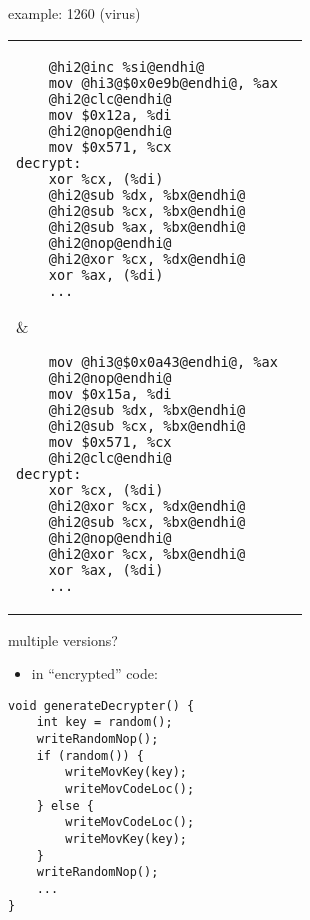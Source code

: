 \begin{frame}[fragile,label=v1260]{example: 1260 (virus)}
\begin{tabular}{ll}
\begin{lstlisting}
    @hi2@inc %si@endhi@
    mov @hi3@$0x0e9b@endhi@, %ax
    @hi2@clc@endhi@
    mov $0x12a, %di
    @hi2@nop@endhi@
    mov $0x571, %cx
decrypt:
    xor %cx, (%di)
    @hi2@sub %dx, %bx@endhi@
    @hi2@sub %cx, %bx@endhi@
    @hi2@sub %ax, %bx@endhi@
    @hi2@nop@endhi@
    @hi2@xor %cx, %dx@endhi@
    xor %ax, (%di)
    ...
\end{lstlisting}
&
\begin{lstlisting}
    mov @hi3@$0x0a43@endhi@, %ax
    @hi2@nop@endhi@
    mov $0x15a, %di
    @hi2@sub %dx, %bx@endhi@
    @hi2@sub %cx, %bx@endhi@
    mov $0x571, %cx
    @hi2@clc@endhi@
decrypt:
    xor %cx, (%di)
    @hi2@xor %cx, %dx@endhi@
    @hi2@sub %cx, %bx@endhi@
    @hi2@nop@endhi@
    @hi2@xor %cx, %bx@endhi@
    xor %ax, (%di)
    ...
\end{lstlisting}
\end{tabular}
\end{frame}

\begin{frame}[fragile,label=multVers]{multiple versions?}
    \begin{itemize}
    \item in ``encrypted'' code:
    \end{itemize}
\lstset{language=C,style=small}
\begin{lstlisting}
void generateDecrypter() {
    int key = random();
    writeRandomNop();
    if (random()) {
        writeMovKey(key);
        writeMovCodeLoc();
    } else {
        writeMovCodeLoc();
        writeMovKey(key);
    }
    writeRandomNop();
    ...
}
\end{lstlisting}
\end{frame}

